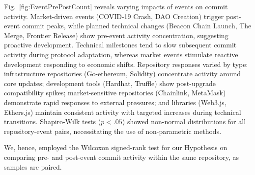 Fig.~\ref{fig:EventPrePostCount} reveals varying impacts of events on commit activity. Market-driven events (COVID-19 Crash, DAO Creation) trigger post-event commit peaks, while planned technical changes (Beacon Chain Launch, The Merge, Frontier Release) show pre-event activity concentration, suggesting proactive development. Technical milestones tend to slow subsequent commit activity during protocol adaptation, whereas market events stimulate reactive development responding to economic shifts.
Repository responses varied by type: infrastructure repositories (Go-ethereum, Solidity) concentrate activity around core updates; development tools (Hardhat, Truffle) show post-upgrade compatibility spikes; market-sensitive repositories (Chainlink, MetaMask) demonstrate rapid responses to external pressures; and libraries (Web3.js, Ethers.js) maintain consistent activity with targeted increases during technical transitions.
Shapiro-Wilk tests ($p < .05$) showed non-normal distributions for all repository-event pairs, necessitating the use of non-parametric methods.

We, hence, employed the Wilcoxon signed-rank test for our Hypothesis on comparing pre- and post-event commit activity within the same repository, as samples are paired.
\begin{table*}[t]
\footnotesize
\caption{Significant Results for Wilcoxon Tests after Benjamini-Hochberg Correction ($p < .05$)}
\label{tab:wilcoxon-results}
\end{table*}

